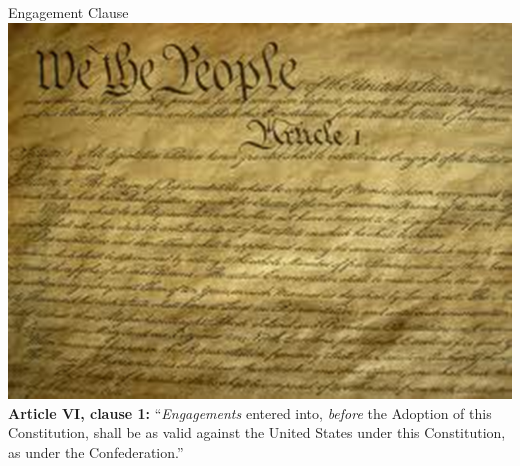 \begin{frame}{Engagement Clause}
   \centering
   \includegraphics[height=.7\textheight]{img/constitution.png} \\
   \textbf{Article VI, clause 1:} ``\emph{Engagements} entered into, \emph{before} the Adoption of this Constitution, shall be as valid against the United States under this Constitution, as under the Confederation.''
\end{frame}

